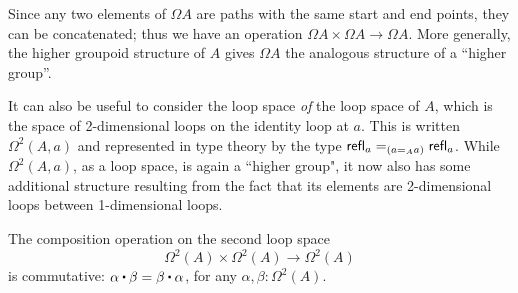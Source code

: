 Since any two elements of $\Omega A$ are paths with the same start and end points, they can be concatenated;
thus we have an operation $\Omega A\times \Omega A\to \Omega A$.
More generally, the higher groupoid structure of $A$ gives $\Omega A$ the analogous structure of a ``higher group''.

It can also be useful to consider the loop space \emph{of} the loop space of $A$, which is the space of 2-dimensional loops on the identity loop at $a$.
This is written $\Omega^2(A,a)$ and represented in type theory by the type $\id[({\id[A]{a}{a}})]{\refl{a}}{\refl{a}}$.
While $\Omega^2(A,a)$, as a loop space, is again a ``higher group", it now also has some additional structure resulting from the fact that its elements are 2-dimensional loops between 1-dimensional loops.  

\begin{thm}\label{thm:EckmannHilton}
  The composition operation on the second loop space
  \begin{equation*}
    \Omega^2(A)\times \Omega^2(A)\to \Omega^2(A)
  \end{equation*}
  is commutative: $\alpha\ct\beta = \beta\ct\alpha$, for any $\alpha, \beta:\Omega^2(A)$.
\end{thm}

